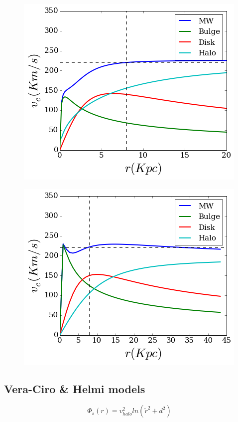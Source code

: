 \begin{figure}[H]\label{MWBesla07}
\centering
\includegraphics[scale=0.7]{../figures/MWBEsla07.png}
\end{figure}



\begin{figure}[H]\label{MWLM10}
\centering
\includegraphics[scale=0.7]{../figures/MWLM10.png}
\end{figure}

\subsection{Vera-Ciro \& Helmi models}

\begin{equation}
\Phi_s(r) = v_{halo}^2 ln(\tilde{r}^2 + d^2)
\end{equation}

